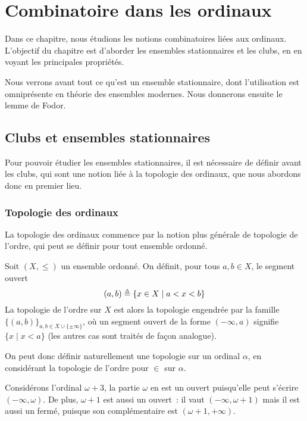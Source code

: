 \chapter{Combinatoire dans les ordinaux}
\label{chp.combi}

\minitoc

Dans ce chapitre, nous étudions les notions combinatoires liées aux ordinaux.
L'objectif du chapitre est d'aborder les ensembles stationnaires et les clubs,
en en voyant les principales propriétés.

Nous verrons avant tout ce qu'est un ensemble stationnaire, dont l'utilisation
est omniprésente en théorie des ensembles modernes. Nous donnerons ensuite le
lemme de Fodor.

\section{Clubs et ensembles stationnaires}

Pour pouvoir étudier les ensembles stationnaires, il est nécessaire de définir
avant les clubs, qui sont une notion liée à la topologie des ordinaux, que nous
abordons donc en premier lieu.

\subsection{Topologie des ordinaux}

La topologie des ordinaux commence par la notion plus générale de topologie de
l'ordre, qui peut se définir pour tout ensemble ordonné.

\begin{definition}
  Soit $(X,\leq)$ un ensemble ordonné. On définit, pour tous $a,b\in X$, le
  segment ouvert
  \[(a,b) \triangleq \{x \in X \mid a < x < b\}\]
  La topologie de l'ordre sur $X$ est alors la topologie engendrée par la
  famille $\{(a,b)\}_{a,b\in X\cup\{\pm\infty\}}$, où un segment ouvert de la forme
  $(-\infty,a)$ signifie $\{x \mid x < a\}$ (les autres cas sont traités de
  façon analogue).
\end{definition}

On peut donc définir naturellement une topologie sur un ordinal $\alpha$, en
considérant la topologie de l'ordre pour $\in$ sur $\alpha$.

\begin{example}
  Considérons l'ordinal $\omega + 3$, la partie $\omega$ en est un ouvert
  puisqu'elle peut s'écrire $(-\infty, \omega)$. De plus, $\omega + 1$ est aussi
  un ouvert~: il vaut $(-\infty, \omega+1)$ mais il est aussi un fermé,
  puisque son complémentaire est $(\omega + 1, +\infty)$.
\end{example}

